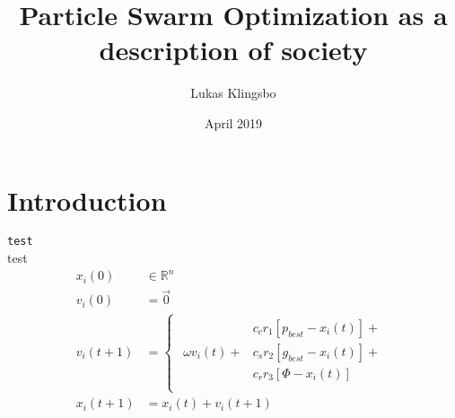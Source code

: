 \documentclass[28pt]{article}
\title{Particle Swarm Optimization as a description of society}
\author{Lukas Klingsbo}
\date{April 2019}
\begin{document}
\maketitle

\section{Introduction}
\texttt{test}\\
test\\

{\Huge
}%
{\Huge
\begin{align*}
x_i(0) &\in \mathbb{R}^n\\
v_i(0) &= \vec{0}\\
v_i(t+1) &=
\begin{cases}
  \begin{aligned}
                      &c_cr_1[p_{best}-x_i(t)] +\\
    \omega v_{i}(t) + &c_sr_2[g_{best}-x_i(t)] +\\
                      &c_rr_3[\Phi-x_i(t)] \\
  \end{aligned}
\end{cases}\\
x_i(t+1) &= x_i(t)+v_i(t+1)\\
\end{align*}
}%


\end{document}
